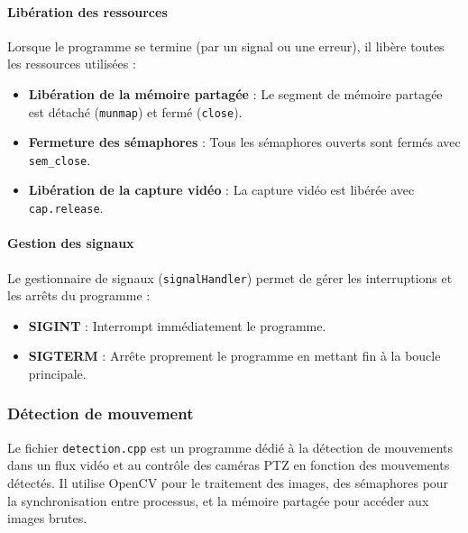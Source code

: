 \documentclass[a4paper, 11pt, french]{article}
\begin{document}
\paragraph{Libération des ressources}
Lorsque le programme se termine (par un signal ou une erreur), il libère toutes les ressources utilisées :
\begin{itemize}
    \item \textbf{Libération de la mémoire partagée} : Le segment de mémoire partagée est détaché (\texttt{munmap}) et fermé (\texttt{close}).
    \item \textbf{Fermeture des sémaphores} : Tous les sémaphores ouverts sont fermés avec \texttt{sem\_close}.
    \item \textbf{Libération de la capture vidéo} : La capture vidéo est libérée avec \texttt{cap.release}.
\end{itemize}

\paragraph{Gestion des signaux}
Le gestionnaire de signaux (\texttt{signalHandler}) permet de gérer les interruptions et les arrêts du programme :
\begin{itemize}
    \item \textbf{SIGINT} : Interrompt immédiatement le programme.
    \item \textbf{SIGTERM} : Arrête proprement le programme en mettant fin à la boucle principale.
\end{itemize}



\subsubsection{Détection de mouvement} \label{par:detection}

Le fichier \texttt{detection.cpp} est un programme dédié à la détection de mouvements dans un flux vidéo et au contrôle des caméras PTZ en fonction des mouvements détectés. Il utilise OpenCV pour le traitement des images, des sémaphores pour la synchronisation entre processus, et la mémoire partagée pour accéder aux images brutes.
\end{document}
